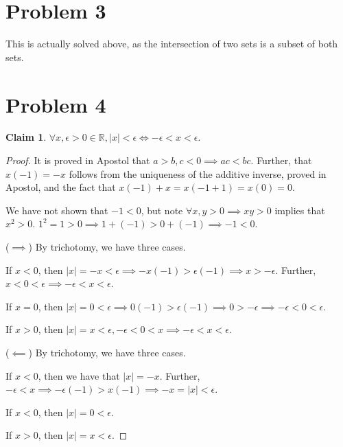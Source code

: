 \documentclass[12pt,letterpaper]{article}
\theoremstyle{definition}
\newtheorem*{claim}{Claim}
\newcommand{\R}{\mathbb{R}}
\begin{document}
\section*{Problem 3}

This is actually solved above, as the intersection of two sets is a subset of both sets.

\section*{Problem 4}

\begin{claim}
    $\forall x, \epsilon > 0 \in \R, |x| < \epsilon \iff -\epsilon < x < \epsilon$.
\end{claim}

\begin{proof}
    It is proved in Apostol that $a > b, c < 0 \implies ac < bc$.
    Further, that $x(-1) = -x$ follows from the uniqueness of the additive inverse,
    proved in Apostol, and the fact that $x(-1) + x = x(-1 + 1) = x(0) = 0$.

    We have not shown that $-1 < 0$, but note $\forall x,y > 0 \implies xy > 0$ implies that
    $x^2 > 0$. $1^2 = 1 > 0 \implies 1 + (-1) > 0 + (-1) \implies -1 < 0$.

    ($\implies$) By trichotomy, we have three cases.
    
    If $x < 0$, then $|x| = -x < \epsilon \implies -x(-1) > \epsilon(-1) \implies x > -\epsilon$.
    Further, $x < 0 < \epsilon \implies -\epsilon < x < \epsilon$.

    If $x = 0$, then $|x| = 0 < \epsilon \implies 0(-1) > \epsilon(-1) \implies 0 > -\epsilon \implies -\epsilon < 0 < \epsilon$.

    If $x > 0$, then $|x| = x < \epsilon, -\epsilon < 0 < x \implies -\epsilon < x < \epsilon$.

    ($\impliedby$) By trichotomy, we have three cases.

    If $x < 0$, then we have that $|x| = -x$. 
    Further, $-\epsilon < x \implies -\epsilon(-1) > x(-1) \implies -x = |x| < \epsilon$.

    If $x < 0$, then $|x| = 0 < \epsilon$.

    If $x > 0$, then $|x| = x < \epsilon$.
\end{proof}
\end{document}
